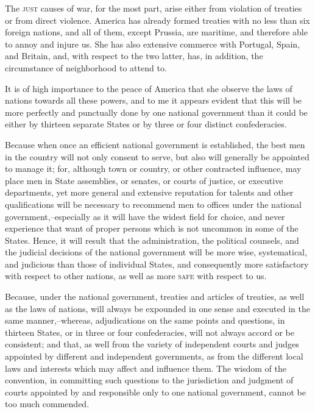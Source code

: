 The \textsc{just} causes of war, for the most part, arise either from violation of treaties or from direct violence. America has already formed treaties with no less than six foreign nations, and all of them, except Prussia, are maritime, and therefore able to annoy and injure us. She has also extensive commerce with Portugal, Spain, and Britain, and, with respect to the two latter, has, in addition, the circumstance of neighborhood to attend to.

It is of high importance to the peace of America that she observe the laws of nations towards all these powers, and to me it appears evident that this will be more perfectly and punctually done by one national government than it could be either by thirteen separate States or by three or four distinct confederacies.

Because when once an efficient national government is established, the best men in the country will not only consent to serve, but also will generally be appointed to manage it; for, although town or country, or other contracted influence, may place men in State assemblies, or senates, or courts of justice, or executive departments, yet more general and extensive reputation for talents and other qualifications will be necessary to recommend men to offices under the national government,--especially as it will have the widest field for choice, and never experience that want of proper persons which is not uncommon in some of the States. Hence, it will result that the administration, the political counsels, and the judicial decisions of the national government will be more wise, systematical, and judicious than those of individual States, and consequently more satisfactory with respect to other nations, as well as more \textsc{safe} with respect to us.

Because, under the national government, treaties and articles of treaties, as well as the laws of nations, will always be expounded in one sense and executed in the same manner,--whereas, adjudications on the same points and questions, in thirteen States, or in three or four confederacies, will not always accord or be consistent; and that, as well from the variety of independent courts and judges appointed by different and independent governments, as from the different local laws and interests which may affect and influence them. The wisdom of the convention, in committing such questions to the jurisdiction and judgment of courts appointed by and responsible only to one national government, cannot be too much commended.

